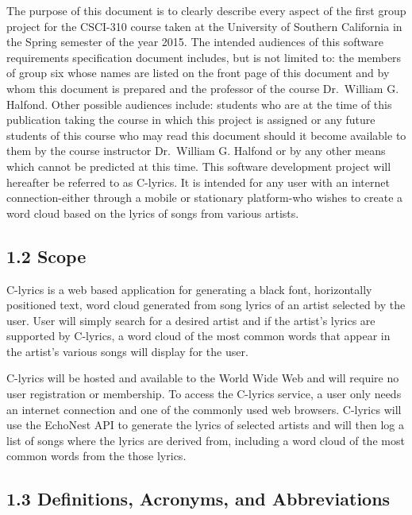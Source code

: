 \documentclass[]{article}
\begin{document}
The purpose of this document is to clearly describe every aspect of the
first group project for the CSCI-310 course taken at the University of
Southern California in the Spring semester of the year 2015. The
intended audiences of this software requirements specification document
includes, but is not limited to: the members of group six whose names
are listed on the front page of this document and by whom this document
is prepared and the professor of the course Dr.~William G. Halfond.
Other possible audiences include: students who are at the time of this
publication taking the course in which this project is assigned or any
future students of this course who may read this document should it
become available to them by the course instructor Dr.~William G. Halfond
or by any other means which cannot be predicted at this time. This
software development project will hereafter be referred to as C-lyrics.
It is intended for any user with an internet connection-either through a
mobile or stationary platform-who wishes to create a word cloud based on
the lyrics of songs from various artists.

\subsection{1.2 Scope}\label{scope}

C-lyrics is a web based application for generating a black font,
horizontally positioned text, word cloud generated from song lyrics of
an artist selected by the user. User will simply search for a desired
artist and if the artist's lyrics are supported by C-lyrics, a word
cloud of the most common words that appear in the artist's various songs
will display for the user.

C-lyrics will be hosted and available to the World Wide Web and will
require no user registration or membership. To access the C-lyrics
service, a user only needs an internet connection and one of the
commonly used web browsers. C-lyrics will use the EchoNest API to
generate the lyrics of selected artists and will then log a list of
songs where the lyrics are derived from, including a word cloud of the
most common words from the those lyrics.

\subsection{1.3 Definitions, Acronyms, and
Abbreviations}\label{definitions-acronyms-and-abbreviations}
\end{document}
